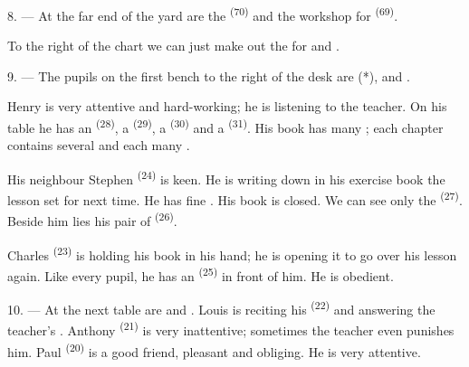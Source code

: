 8. --- At the far end of the yard are the  \textsuperscript{(70)}
and the workshop for  \textsuperscript{(69)}.

To the right of the chart we can just make out the  for
 and .


\VUsaut{2.4mm}

\VUsaut{3.0mm}

9. --- The pupils on the first bench to the right of the desk are
 (*),  and .

Henry is very attentive and hard-working; he is listening to the teacher. On his table he has
an  \textsuperscript{(28)}, a
 \textsuperscript{(29)}, a  \textsuperscript{(30)} and a
 \textsuperscript{(31)}. His book has many ; each chapter
contains several  and each  many .

His neighbour Stephen \textsuperscript{(24)} is keen. He is writing down in his exercise book
the lesson set for next time. He has fine
. His book is closed. We can see only the 
\textsuperscript{(27)}. Beside him lies his pair of  \textsuperscript{(26)}.

Charles \textsuperscript{(23)} is holding his book in his hand; he is opening it to go over
his lesson again. Like every pupil, he has an  \textsuperscript{(25)} in front
of him. He is obedient.

10. --- At the next table are  and . Louis is reciting his
 \textsuperscript{(22)} and answering the teacher's
. Anthony \textsuperscript{(21)} is very inattentive; sometimes the
teacher even punishes him. Paul \textsuperscript{(20)} is a good friend, pleasant and
obliging. He is very attentive.

